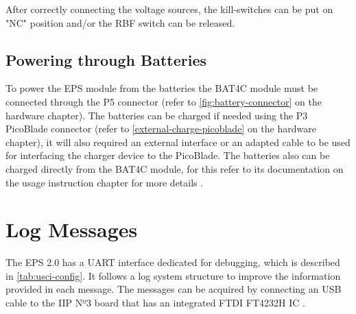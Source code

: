 After correctly connecting the voltage sources, the kill-switches can be put on "NC" position and/or the RBF switch can be released.


\subsection{Powering through Batteries}

To power the EPS module from the batteries the BAT4C module must be connected through the P5 connector (refer to \autoref{fig:battery-connector} on the hardware chapter).
The batteries can be charged if needed using the P3 PicoBlade connector (refer to \autoref{external-charge-picoblade} on the hardware chapter), it will also required an external interface or an adapted cable to be used for interfacing the charger device to the PicoBlade.
The batteries also can be charged directly from the BAT4C module, for this refer to its documentation on the usage instruction chapter for more details \cite{bat4c}.


\section{Log Messages}

The EPS 2.0 has a UART interface dedicated for debugging, which is described in \autoref{tab:usci-config}. It follows a log system structure to improve the information provided in each message.
The messages can be acquired by connecting an USB cable to the IIP Nº3 board that has an integrated FTDI FT4232H IC \cite{iip}.
